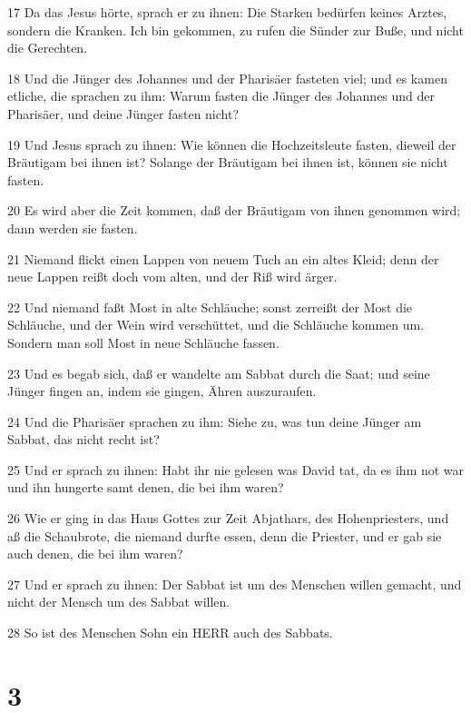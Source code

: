 \par 17 Da das Jesus hörte, sprach er zu ihnen: Die Starken bedürfen keines Arztes, sondern die Kranken. Ich bin gekommen, zu rufen die Sünder zur Buße, und nicht die Gerechten.
\par 18 Und die Jünger des Johannes und der Pharisäer fasteten viel; und es kamen etliche, die sprachen zu ihm: Warum fasten die Jünger des Johannes und der Pharisäer, und deine Jünger fasten nicht?
\par 19 Und Jesus sprach zu ihnen: Wie können die Hochzeitsleute fasten, dieweil der Bräutigam bei ihnen ist? Solange der Bräutigam bei ihnen ist, können sie nicht fasten.
\par 20 Es wird aber die Zeit kommen, daß der Bräutigam von ihnen genommen wird; dann werden sie fasten.
\par 21 Niemand flickt einen Lappen von neuem Tuch an ein altes Kleid; denn der neue Lappen reißt doch vom alten, und der Riß wird ärger.
\par 22 Und niemand faßt Most in alte Schläuche; sonst zerreißt der Most die Schläuche, und der Wein wird verschüttet, und die Schläuche kommen um. Sondern man soll Most in neue Schläuche fassen.
\par 23 Und es begab sich, daß er wandelte am Sabbat durch die Saat; und seine Jünger fingen an, indem sie gingen, Ähren auszuraufen.
\par 24 Und die Pharisäer sprachen zu ihm: Siehe zu, was tun deine Jünger am Sabbat, das nicht recht ist?
\par 25 Und er sprach zu ihnen: Habt ihr nie gelesen was David tat, da es ihm not war und ihn hungerte samt denen, die bei ihm waren?
\par 26 Wie er ging in das Haus Gottes zur Zeit Abjathars, des Hohenpriesters, und aß die Schaubrote, die niemand durfte essen, denn die Priester, und er gab sie auch denen, die bei ihm waren?
\par 27 Und er sprach zu ihnen: Der Sabbat ist um des Menschen willen gemacht, und nicht der Mensch um des Sabbat willen.
\par 28 So ist des Menschen Sohn ein HERR auch des Sabbats.

\chapter{3}


